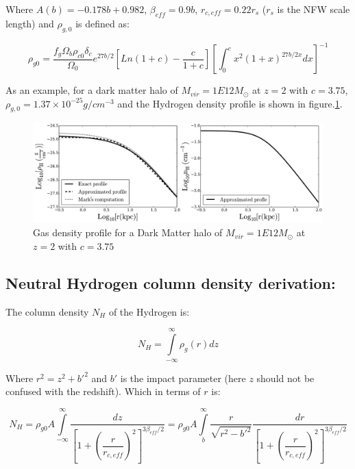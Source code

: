 \documentclass[a4,useAMS,usenatbib,usegraphicx]{mn2e}
\begin{document}
Where $A(b) = -0.178b + 0.982$, $\beta_{eff} = 0.9 b$, $r_{c, eff}=
0.22 r_s$ ($r_s$ is the NFW scale length) and $\rho_{g,0}$ is defined
as:

\begin{equation}\label{eq:rhog0}
\rho_{g0} =\dfrac{f_g\Omega_{b}\rho_{c0}\delta_{c}}{\Omega_0}e^{27b/2} \left
[Ln(1+c) - \dfrac{c}{1+c} \right] \left [ \int_0^c x^2(1+x)^{27b/2x} dx \right ]^{-1}
\end{equation}

As an example, for a dark matter halo of $M_{vir} = 1E12 M_{\odot}$ at
$z=2$ with $c=3.75$,  $\rho_{g,0}=1.37\times10^{-25} g/cm^{-3}$ and
the Hydrogen density profile is shown in figure.\ref{fig:gp}.

\begin{figure}
\centering
\includegraphics[scale=0.5]{../figures/gasprofile.pdf}
\caption{Gas density profile for a Dark Matter halo of $M_{vir} = 1E12
M_{\odot}$ at $z=2$ with $c=3.75$ \label{fig:gp}}
\end{figure}


\subsection{Neutral Hydrogen column density derivation:}\label{sec:NH}

The column density $N_{H}$ of the Hydrogen is:

\begin{equation}
N_{H} = \int \limits_{-\infty}^{\infty}\rho_g(r)dz
\end{equation}

Where $r^2 = z^2 + b'^2$ and $b'$ is the impact parameter (here $z$
should not be confused with the redshift).
Which in terms of $r$ is:

\begin{equation}
N_{H} = \rho_{g0}A \int \limits_{-\infty}^{\infty} \dfrac{dz}{\left
[ 1 + \left(\dfrac{r}{r_{c,eff}} \right)^2 \right]^{3\beta_{eff}/2}}
= \rho_{g0}A \int \limits_{b}^{\infty}\dfrac{r}{\sqrt{r^2 - b'^2}}\dfrac{dr}
{\left [ 1 + \left(\dfrac{r}{r_{c,eff}} \right)^2 \right]^{3\beta_{eff}/2}}
\end{equation}
\end{document}
